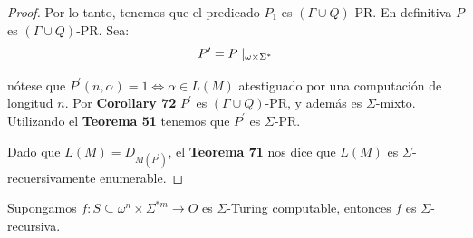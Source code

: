 \begin{proof}
    \PN Por lo tanto, tenemos que el predicado $P_1$ es $(\Gamma \cup Q)$-PR. En definitiva $P$ es $(\Gamma \cup Q)$-PR.
    \PN Sea:
    \[
      P^{\prime }=P\mid _{\omega \times \Sigma^{\ast}}
    \]

    \PN nótese que $P^{\prime}(n,\alpha) = 1 \Leftrightarrow \alpha \in L(M)$ atestiguado por una computación de
    longitud $n$.
    \PN Por \textbf{Corollary 72} $P^{\prime}$ es $(\Gamma \cup Q)$-PR, y además es $\Sigma$-mixto. Utilizando el
    \textbf{Teorema 51} tenemos que $P^{\prime}$ es $\Sigma $-PR.

    \PN Dado que $L(M) = D_{M(P^{\prime})}$, el \textbf{Teorema 71} nos dice que $L(M)$ es $\Sigma$-recuersivamente
    enumerable.
  \end{proof}

	\begin{theorem}
		\PN Supongamos $f: S \subseteq \omega^{n} \times \Sigma^{\ast m} \rightarrow O$ es $\Sigma$-Turing computable,
    entonces $f$ es $\Sigma$-recursiva.
  \end{theorem}
